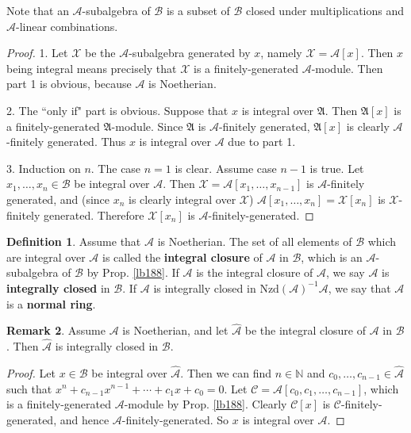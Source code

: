 \documentclass[12pt,b5paper,notitlepage]{report}
\theoremstyle{definition}
\newtheorem{df}{Definition}[section]
\newtheorem{rem}[df]{Remark}
\theoremstyle{plain}
\newcommand{\fk}{\mathfrak}
\newcommand{\mc}{\mathcal}
\newcommand{\wht}{\widehat}
\newcommand{\Nbb}{\mathbb N}
\newcommand{\Nzd}{\mathrm{Nzd}}
\numberwithin{equation}{section}
\begin{document}
Note that an $\mc A$-subalgebra of $\mc B$ is a subset of $\mc B$ closed under multiplications and $\mc A$-linear combinations.

\begin{proof}
1. Let $\mc X$ be the $\mc A$-subalgebra generated by $x$, namely $\mc X=\mc A[x]$. Then $x$ being integral means precisely that $\mc X$ is a finitely-generated $\mc A$-module. Then part 1 is obvious, because $\mc A$ is Noetherian.

2. The ``only if" part is obvious. Suppose that $x$ is integral over $\fk A$. Then $\fk A[x]$ is a finitely-generated $\fk A$-module. Since $\fk A$ is $\mc A$-finitely generated, $\fk A[x]$ is clearly $\mc A$-finitely generated. Thus $x$ is integral over $\mc A$ due to part 1. 

3. Induction on $n$. The case $n=1$ is clear. Assume case $n-1$ is true. Let $x_1,\dots,x_n\in\mc B$ be integral over $\mc A$. Then $\mc X=\mc A[x_1,\dots,x_{n-1}]$ is $\mc A$-finitely generated, and (since $x_n$ is clearly integral over $\mc X$) $\mc A[x_1,\dots,x_n]=\mc X[x_n]$ is $\mc X$-finitely generated. Therefore $\mc X[x_n]$ is $\mc A$-finitely-generated.
\end{proof}


\begin{df}
Assume that $\mc A$ is Noetherian. The set of all elements of $\mc B$ which are integral over $\mc A$ is called the \textbf{integral closure} of $\mc A$ in $\mc B$, which is an $\mc A$-subalgebra of $\mc B$ by Prop. \ref{lb188}. If $\mc A$ is the integral closure of $\mc A$, we say $\mc A$ is \textbf{integrally closed} in $\mc B$. If $\mc A$ is integrally closed in $\Nzd(\mc A)^{-1}\mc A$, we say that $\mc A$ is a \textbf{normal ring}. 
\end{df}

\begin{rem}\label{lb226}
Assume $\mc A$ is Noetherian, and let $\wht{\mc A}$ be the integral closure of $\mc A$ in $\mc B$. Then  $\wht{\mc A}$ is integrally closed in $\mc B$. 
\end{rem}


\begin{proof}
Let $x\in\mc B$ be integral over $\wht{\mc A}$. Then we can find $n\in\Nbb$ and $c_0,\dots,c_{n-1}\in\wht{\mc A}$ such that $x^n+c_{n-1}x^{n-1}+\cdots+c_1x+c_0=0$. Let $\mc C=\mc A[c_0,c_1,\dots,c_{n-1}]$, which is a finitely-generated $\mc A$-module by Prop. \ref{lb188}. Clearly $\mc C[x]$ is $\mc C$-finitely-generated, and hence $\mc A$-finitely-generated. So $x$ is integral over $\mc A$.
\end{proof}
\end{document}
